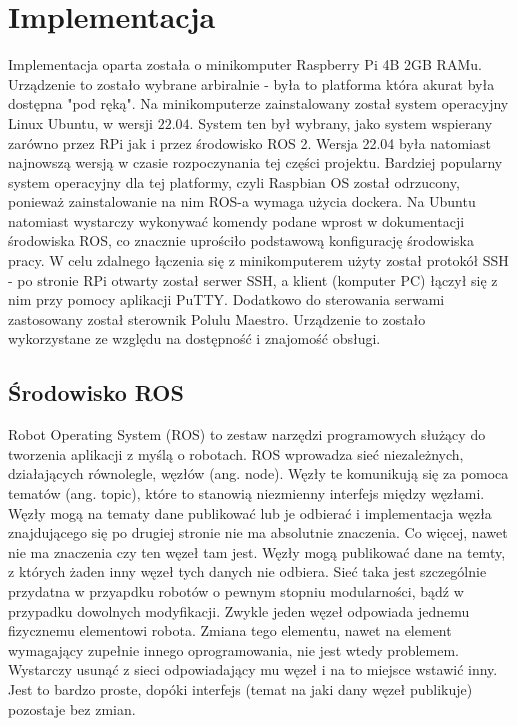 \chapter{Implementacja}
Implementacja oparta została o minikomputer Raspberry Pi 4B 2GB RAMu. Urządzenie to zostało wybrane arbiralnie - była to platforma która akurat była dostępna "pod ręką". Na minikomputerze zainstalowany został system operacyjny Linux Ubuntu, w wersji $22.04$. System ten był wybrany, jako system wspierany zarówno przez RPi jak i przez środowisko ROS 2. Wersja 22.04 była natomiast najnowszą wersją w czasie rozpoczynania tej części projektu. Bardziej popularny system operacyjny dla tej platformy, czyli Raspbian OS został odrzucony, ponieważ zainstalowanie na nim ROS-a wymaga użycia dockera. Na Ubuntu natomiast wystarczy wykonywać komendy podane wprost w dokumentacji środowiska ROS, co znacznie uprościło podstawową konfigurację środowiska pracy. W celu zdalnego łączenia się z minikomputerem użyty został protokół SSH - po stronie RPi otwarty został serwer SSH, a klient (komputer PC) łączył się z nim przy pomocy aplikacji PuTTY. Dodatkowo do sterowania serwami zastosowany został sterownik Polulu Maestro. Urządzenie to zostało wykorzystane ze względu na dostępność i znajomość obsługi.
\section{Środowisko ROS \cite{ROS_docs}}
Robot Operating System (ROS) to zestaw narzędzi programowych służący do tworzenia aplikacji z myślą o robotach. ROS wprowadza sieć niezależnych, działających równolegle, węzłów (ang. node). Węzły te komunikują się za pomoca tematów (ang. topic), które to stanowią niezmienny interfejs między węzłami. 
Węzły mogą na tematy dane publikować lub je odbierać i implementacja węzła znajdującego się po drugiej stronie nie ma absolutnie znaczenia. Co więcej, nawet nie ma znaczenia czy ten węzeł tam jest. Węzły mogą publikować dane na temty, z których żaden inny węzeł tych danych nie odbiera. Sieć taka jest szczególnie przydatna w przyapdku robotów o pewnym stopniu modularności, bądź w przypadku dowolnych modyfikacji. Zwykle jeden węzeł odpowiada jednemu fizycznemu elementowi robota. Zmiana tego elementu, nawet na element wymagający zupełnie innego oprogramowania, nie jest wtedy problemem. Wystarczy usunąć z sieci odpowiadający mu węzeł i na to miejsce wstawić inny. Jest to bardzo proste, dopóki interfejs (temat na jaki dany węzeł publikuje) pozostaje bez zmian.
